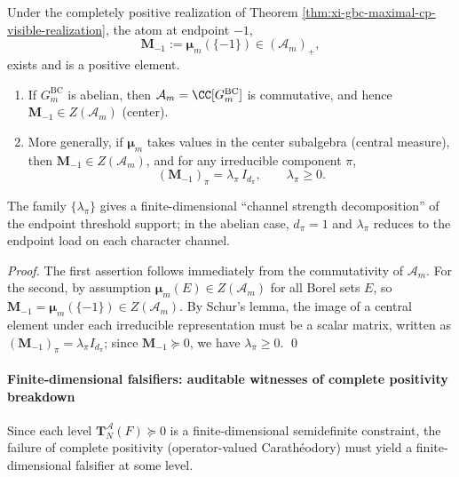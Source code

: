 \begin{theorem}\label{thm:xi-endpoint-atom-central-channel-strength}
Under the completely positive realization of Theorem \ref{thm:xi-gbc-maximal-cp-visible-realization}, the atom at endpoint \(-1\),
\[
\mathbf{M}_{-1}:=\boldsymbol\mu_m(\{-1\})\in(\mathcal{A}_m)_+,
\]
exists and is a positive element.
\begin{enumerate}
  \item If \(G^{\mathrm{BC}}_m\) is abelian, then \(\mathcal{A}_m=\CC[G^{\mathrm{BC}}_m]\) is commutative, and hence \(\mathbf{M}_{-1}\in Z(\mathcal{A}_m)\) (center).
  \item More generally, if \(\boldsymbol\mu_m\) takes values in the center subalgebra (central measure), then \(\mathbf{M}_{-1}\in Z(\mathcal{A}_m)\), and for any irreducible component \(\pi\),
  \begin{equation}\label{eq:xi-endpoint-atom-channel-strength}
  \boxed{\;
  (\mathbf{M}_{-1})_\pi=\lambda_\pi\,I_{d_\pi},\qquad \lambda_\pi\ge 0.\;}
  \end{equation}
\end{enumerate}
The family \(\{\lambda_\pi\}\) gives a finite-dimensional ``channel strength decomposition'' of the endpoint threshold support; in the abelian case, \(d_\pi=1\) and \(\lambda_\pi\) reduces to the endpoint load on each character channel.
\end{theorem}

\begin{proof}
The first assertion follows immediately from the commutativity of \(\mathcal{A}_m\).
For the second, by assumption \(\boldsymbol\mu_m(E)\in Z(\mathcal{A}_m)\) for all Borel sets \(E\), so \(\mathbf{M}_{-1}=\boldsymbol\mu_m(\{-1\})\in Z(\mathcal{A}_m)\).
By Schur's lemma, the image of a central element under each irreducible representation must be a scalar matrix, written as \((\mathbf{M}_{-1})_\pi=\lambda_\pi I_{d_\pi}\);
since \(\mathbf{M}_{-1}\succeq 0\), we have \(\lambda_\pi\ge 0\). \qed
\end{proof}

\paragraph{Finite-dimensional falsifiers: auditable witnesses of complete positivity breakdown}
Since each level \(\mathbf{T}^{\mathcal{A}}_N(F)\succeq 0\) is a finite-dimensional semidefinite constraint, the failure of complete positivity (operator-valued Carath\'eodory) must yield a finite-dimensional falsifier at some level.

